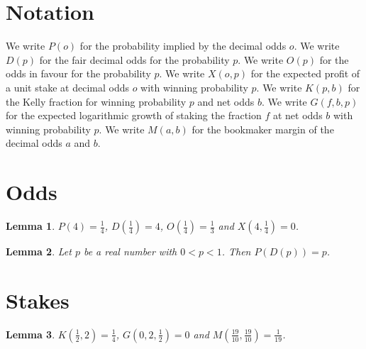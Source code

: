 \documentclass{article}
\newtheorem{lemma}{Lemma}
\begin{document}
\section{Notation}

We write $P(o)$ for the probability implied by the decimal odds $o$.
We write $D(p)$ for the fair decimal odds for the probability $p$.
We write $O(p)$ for the odds in favour for the probability $p$.
We write $X(o,p)$ for the expected profit of a unit stake at decimal odds $o$ with winning probability $p$.
We write $K(p,b)$ for the Kelly fraction for winning probability $p$ and net odds $b$.
We write $G(f,b,p)$ for the expected logarithmic growth of staking the fraction $f$ at net odds $b$ with winning probability $p$.
We write $M(a,b)$ for the bookmaker margin of the decimal odds $a$ and $b$.

\section{Odds}

\begin{lemma}\label{odds}
$P(4)=\frac14$, $D(\frac14)=4$, $O(\frac14)=\frac13$ and $X(4,\frac14)=0$.
\end{lemma}

\begin{lemma}\label{inverse}
Let $p$ be a real number with $0<p<1$. Then $P(D(p))=p$.
\end{lemma}

\section{Stakes}

\begin{lemma}\label{kelly}
$K(\frac12,2)=\frac14$, $G(0,2,\frac12)=0$ and $M(\frac{19}{10},\frac{19}{10})=\frac{1}{19}$.
\end{lemma}
\end{document}
